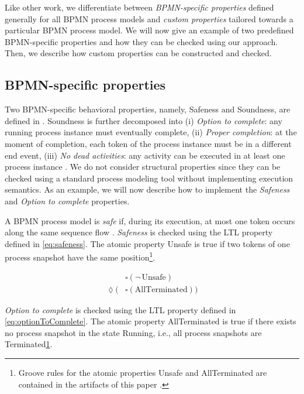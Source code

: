 \documentclass[submission, copyright, creativecommons]{eptcs}
\begin{document}
Like other work, we differentiate between \emph{BPMN-specific properties} defined generally for all BPMN process models and \emph{custom properties} tailored towards a particular BPMN process model.
We will now give an example of two predefined BPMN-specific properties and how they can be checked using our approach.
Then, we describe how custom properties can be constructed and checked.

\subsection{BPMN-specific properties}
Two BPMN-specific behavioral properties, namely, Safeness and Soundness, are defined in \cite{corradiniClassificationBPMNCollaborations2018}.
Soundness is further decomposed into (i) \emph{Option to complete}: any running process instance must eventually complete, (ii) \emph{Proper completion}: at the moment of completion, each token of the process instance must be in a different end event, (iii) \emph{No dead activities}: any activity can be executed in at least one process instance \cite{corradiniClassificationBPMNCollaborations2018}.
We do not consider structural properties since they can be checked using a standard process modeling tool without implementing execution semantics.
As an example, we will now describe how to implement the \emph{Safeness} and \emph{Option to complete} properties.

A BPMN process model is \emph{safe} if, during its execution, at most one token occurs along the same sequence flow \cite{corradiniClassificationBPMNCollaborations2018}.
\emph{Safeness} is checked using the LTL property defined in \eqref{eq:safeness}.
The atomic property \textsf{Unsafe} is true if two tokens of one process snapshot have the same position\footnote{\label{footnote:atomicProps}Groove rules for the atomic properties \textsf{Unsafe} and \textsf{AllTerminated} are contained in the artifacts of this paper \cite{timkrauterArtifactsTERMGRAPH2022}.}.

\begin{align}
    & \square (\neg \,\text{Unsafe}) \label{eq:safeness} \\
    \lozenge (& \square(\text{AllTerminated})) \label{eq:optionToComplete}
\end{align}

\emph{Option to complete} is checked using the LTL property defined in \eqref{eq:optionToComplete}.
The atomic property \textsf{AllTerminated} is true if there exists no process snapshot in the state \textsf{Running}, i.e., all process snapshots are \textsf{Terminated}\cref{footnote:atomicProps}.
\end{document}
